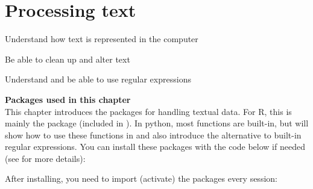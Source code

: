 \chapter{Processing text}
\label{chap:protext}


\begin{abstract}{Abstract}
Many data sets that are relevant for social science consist of textual data, from political discussions and newspaper archives to open-ended survey questions and reviews. This chapter gives an introduction in dealing with textual data using base functions in Python and (mostly) the  package in R. 
\end{abstract}


\begin{objectives}
\item Understand how text is represented in the computer
\item Be able to clean up and alter text
\item Understand and be able to use regular expressions 
\end{objectives}


\newpage
\begin{feature}
  \textbf{Packages used in this chapter}\\
  This chapter introduces the packages for handling textual data.
  For R, this is mainly the  package (included in \tidyverse).
  In python, most functions are built-in, but will show how to use these functions in  and also introduce the  alternative to built-in regular expressions.
You can install these packages with the code below if needed  (see  for more details):


\noindent After installing, you need to import (activate) the packages every session:


\end{feature}







